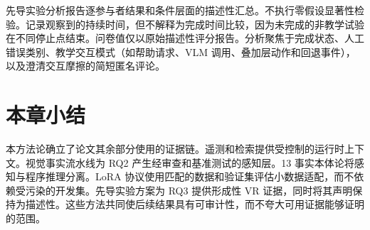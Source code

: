 先导实验分析报告逐参与者结果和条件层面的描述性汇总。不执行零假设显著性检验。记录观察到的持续时间，但不解释为完成时间比较，因为未完成的非教学试验在不同停止点结束。问卷值仅以原始描述性评分报告。分析聚焦于完成状态、人工错误类别、教学交互模式（如帮助请求、VLM 调用、叠加层动作和回退事件），以及澄清交互摩擦的简短匿名评论。

\section{本章小结}\label{sec:method-summary}

本方法论确立了论文其余部分使用的证据链。遥测和检索提供受控制的运行时上下文。视觉事实流水线为 RQ2 产生经审查和基准测试的感知层。13 事实本体论将感知与程序推理分离。LoRA 协议使用匹配的数据和验证集评估小数据适配，而不依赖受污染的开发集。先导实验方案为 RQ3 提供形成性 VR 证据，同时将其声明保持为描述性。这些方法共同使后续结果具有可审计性，而不夸大可用证据能够证明的范围。
